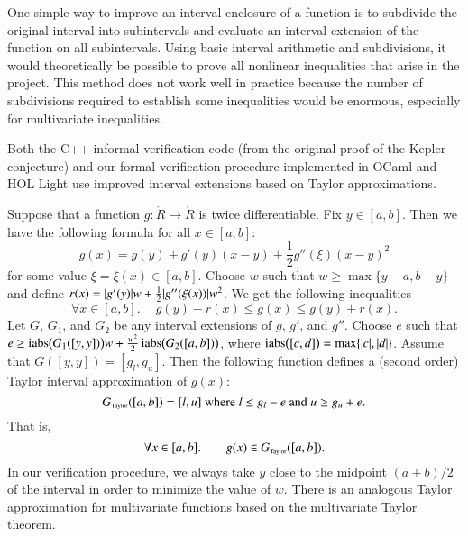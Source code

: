 One simple way to improve an interval enclosure of a function is to
subdivide the original interval into subintervals and evaluate an
interval extension of the function on all subintervals.  Using basic
interval arithmetic and subdivisions, it would theoretically be
possible to prove all nonlinear inequalities that arise in the
project. This method does not work well in practice
because the number of subdivisions required to establish some
inequalities would be enormous, especially for multivariate
inequalities.

Both the  C++ informal verification code (from
the original proof of the Kepler conjecture) and our formal
verification procedure implemented in OCaml and HOL Light use improved
interval extensions based on Taylor approximations.

Suppose that a function $g:\ring{R}\to\ring{R}$ is twice differentiable. Fix $y \in
[a,b]$. Then we have the following formula for all $x \in [a,b]$:
\begin{equation*}
g(x) = g(y) + g'(y)(x - y) + \frac{1}{2}g''(\xi)(x - y)^2
\end{equation*}
for some value $\xi = \xi(x) \in [a,b]$.  Choose $w$ such that $w \ge
\max\{y - a, b - y\}$ and define $r(x) = \lvert g'(y)\rvert w +
\frac{1}{2}\lvert g''(\xi(x))\rvert w^2$. We get the following inequalities
\begin{equation*}
\forall x \in [a,b].\quad\ g(y) - r(x) \le g(x) \le g(y) + r(x).
\end{equation*}
Let $G$, $G_1$, and $G_2$ be any interval extensions of $g$, $g'$, and
$g''$. Choose $e$ such that $e \ge \mathop{\rm iabs}\bigl(G_1([y,y])\bigr)w +
\frac{w^2}{2}\mathop{\rm iabs}\bigl(G_2([a,b])\bigr)$, where
$\mathop{\rm iabs}\bigl([c,d]\bigr) = \max\{\lvert c\rvert, \lvert d\rvert\}$.  Assume that
$G([y,y]) = [g_l,g_u]$. Then the following function defines a (second
order) Taylor interval approximation of $g(x)$:
\begin{equation*}
G_{\hbox{\tiny Taylor}}([a,b]) = [l, u] \text{ where $l \le g_l - e$ and $u \ge g_u + e$}.
\end{equation*}
That is,
\begin{equation*}
\forall x \in [a,b].\quad \quad g(x) \in G_{\hbox{\tiny Taylor}}([a,b]).
\end{equation*}
In our verification procedure, we always take $y$ close to the
midpoint $(a+b)/2$ of the interval in order to minimize the value of
$w$. There is an analogous Taylor approximation for multivariate
functions based on the multivariate Taylor theorem.

